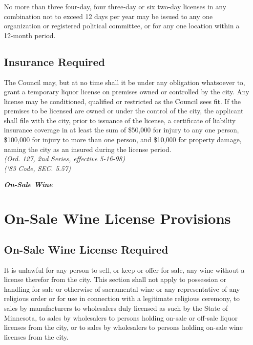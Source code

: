 \subsubsection{}
No more than three four-day, four three-day or six two-day licenses in any combination not to exceed 12 days per year may be issued to any one organization or registered political committee, or for any one location within a 12-month period.
\subsection{Insurance Required}
The Council may, but at no time shall it be under any obligation whatsoever to, grant a temporary liquor license on premises owned or controlled by the city.  Any license may be conditioned, qualified or restricted as the Council sees fit.  If the premises to be licensed are owned or under the control of the city, the applicant shall file with the city, prior to issuance of the license, a certificate of liability insurance coverage in at least the sum of \$50,000 for injury to any one person, \$100,000 for injury to more than one person, and \$10,000 for property damage, naming the city as an insured during the license period.\\
\emph{(Ord. 127, 2nd Series, effective 5-16-98)}\\
\emph{(‘83 Code, SEC. 5.57)}

\begin{center}
    \emph{\textbf{\LARGE{On-Sale Wine}}}
\end{center}

\setcounter{section}{99}
\section{On-Sale Wine License Provisions}
\subsection{On-Sale Wine License Required}
It is unlawful for any person to sell, or keep or offer for sale, any wine without a license therefor from the city. This section shall not apply to possession or handling for sale or otherwise of sacramental wine or any representative of any religious order or for use in connection with a legitimate religious ceremony, to sales by manufacturers to wholesalers duly licensed as such by the State of Minnesota, to sales by wholesalers to persons holding on-sale or off-sale liquor licenses from the city, or to sales by wholesalers to persons holding on-sale wine licenses from the city.
